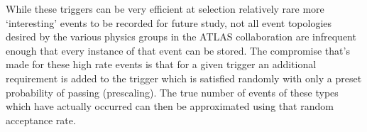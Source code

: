 While these triggers can be very efficient at selection relatively rare more `interesting' events to be recorded for future study, not all event topologies desired by the various physics groups in the ATLAS collaboration are infrequent enough that every instance of that event can be stored.  
The compromise that's made for these high rate events is that for a given trigger an additional requirement is added to the trigger which is satisfied randomly with only a preset probability of passing (prescaling).  
The true number of events of these types which have actually occurred can then be approximated using that random acceptance rate.  
 
 
 





